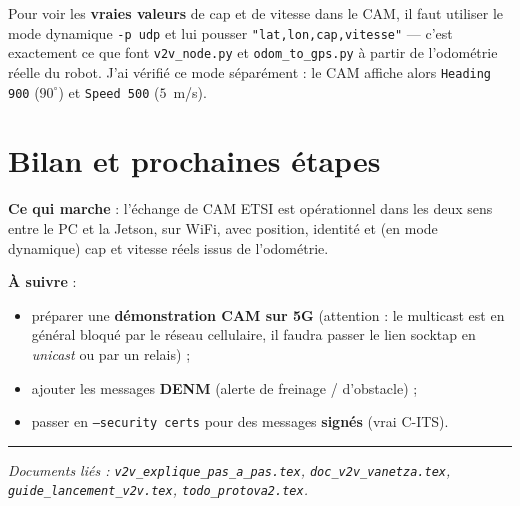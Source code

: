 \documentclass[a4paper,11pt]{article}
\newcommand{\code}[1]{\texttt{#1}}
\begin{document}
Pour voir les \textbf{vraies valeurs} de cap et de vitesse dans le CAM, il faut utiliser le
mode dynamique \code{-p udp} et lui pousser \code{"lat,lon,cap,vitesse"} --- c'est
exactement ce que font \code{v2v\_node.py} et \code{odom\_to\_gps.py} à partir de
l'odométrie réelle du robot. J'ai vérifié ce mode séparément : le CAM affiche alors
\code{Heading 900} ($90^\circ$) et \code{Speed 500} ($5$~m/s).

\section{Bilan et prochaines étapes}
\textbf{Ce qui marche} : l'échange de CAM ETSI est opérationnel dans les deux sens entre le
PC et la Jetson, sur WiFi, avec position, identité et (en mode dynamique) cap et vitesse
réels issus de l'odométrie.

\textbf{À suivre} :
\begin{itemize}[leftmargin=1.6em]
  \item préparer une \textbf{démonstration CAM sur 5G} (attention : le multicast est en
        général bloqué par le réseau cellulaire, il faudra passer le lien socktap en
        \emph{unicast} ou par un relais) ;
  \item ajouter les messages \textbf{DENM} (alerte de freinage / d'obstacle) ;
  \item passer en \code{--security certs} pour des messages \textbf{signés} (vrai C-ITS).
\end{itemize}

\vspace{8pt}\hrule
{\footnotesize\itshape Documents liés : \code{v2v\_explique\_pas\_a\_pas.tex},
\code{doc\_v2v\_vanetza.tex}, \code{guide\_lancement\_v2v.tex}, \code{todo\_protova2.tex}.}
\end{document}
